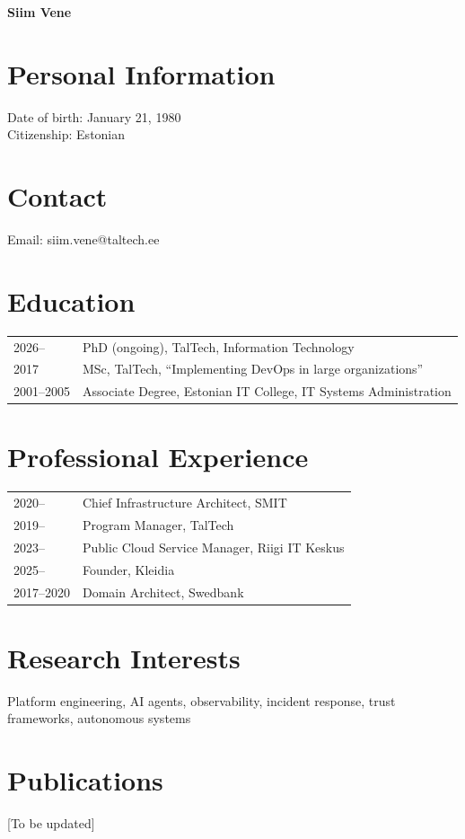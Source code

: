 \documentclass{TTUPhD}
\begin{document}
\begin{curriculumvitae}
\textbf{Siim Vene}

\section*{Personal Information}
Date of birth: January 21, 1980\\
Citizenship: Estonian

\section*{Contact}
Email: siim.vene@taltech.ee

\section*{Education}
\begin{tabular}{ll}
2026-- & PhD (ongoing), TalTech, Information Technology \\
2017 & MSc, TalTech, ``Implementing DevOps in large organizations'' \\
2001--2005 & Associate Degree, Estonian IT College, IT Systems Administration \\
\end{tabular}

\section*{Professional Experience}
\begin{tabular}{ll}
2020-- & Chief Infrastructure Architect, SMIT \\
2019-- & Program Manager, TalTech \\
2023-- & Public Cloud Service Manager, Riigi IT Keskus \\
2025-- & Founder, Kleidia \\
2017--2020 & Domain Architect, Swedbank \\
\end{tabular}

\section*{Research Interests}
Platform engineering, AI agents, observability, incident response, trust frameworks, autonomous systems

\section*{Publications}
[To be updated]
\end{curriculumvitae}
\end{document}
